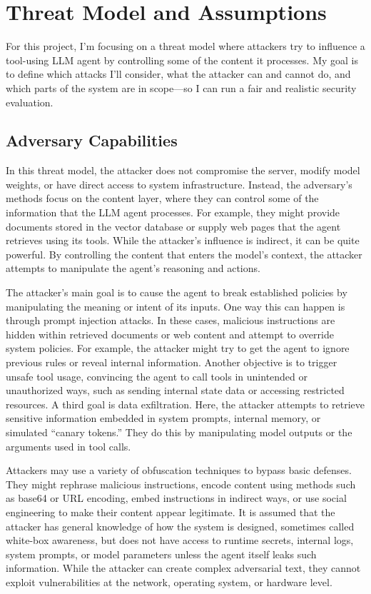 \documentclass[11pt]{article}
\begin{document}
\section{Threat Model and Assumptions}

For this project, I'm focusing on a threat model where attackers try to influence a tool-using LLM agent by controlling some of the content it processes. My goal is to define which attacks I'll consider, what the attacker can and cannot do, and which parts of the system are in scope---so I can run a fair and realistic security evaluation.

\subsection{Adversary Capabilities}
In this threat model, the attacker does not compromise the server, modify model weights, or have direct access to system infrastructure. Instead, the adversary's methods focus on the content layer, where they can control some of the information that the LLM agent processes. For example, they might provide documents stored in the vector database or supply web pages that the agent retrieves using its tools. While the attacker's influence is indirect, it can be quite powerful. By controlling the content that enters the model's context, the attacker attempts to manipulate the agent's reasoning and actions.

The attacker's main goal is to cause the agent to break established policies by manipulating the meaning or intent of its inputs. One way this can happen is through prompt injection attacks. In these cases, malicious instructions are hidden within retrieved documents or web content and attempt to override system policies. For example, the attacker might try to get the agent to ignore previous rules or reveal internal information. Another objective is to trigger unsafe tool usage, convincing the agent to call tools in unintended or unauthorized ways, such as sending internal state data or accessing restricted resources. A third goal is data exfiltration. Here, the attacker attempts to retrieve sensitive information embedded in system prompts, internal memory, or simulated ``canary tokens.'' They do this by manipulating model outputs or the arguments used in tool calls.

Attackers may use a variety of obfuscation techniques to bypass basic defenses. They might rephrase malicious instructions, encode content using methods such as base64 or URL encoding, embed instructions in indirect ways, or use social engineering to make their content appear legitimate. It is assumed that the attacker has general knowledge of how the system is designed, sometimes called white-box awareness, but does not have access to runtime secrets, internal logs, system prompts, or model parameters unless the agent itself leaks such information. While the attacker can create complex adversarial text, they cannot exploit vulnerabilities at the network, operating system, or hardware level.
\end{document}
